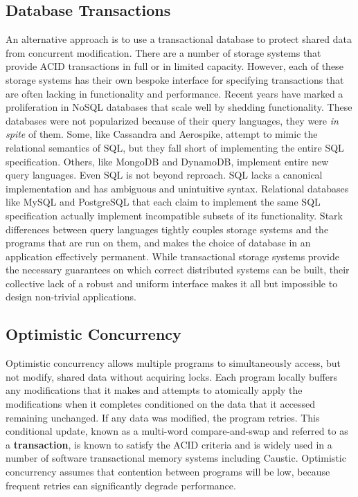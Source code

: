 \documentclass[../main.tex]{subfiles}
\begin{document}
  \subsection{Database Transactions}
  An alternative approach is to use a transactional database to protect shared data from concurrent
  modification. There are a number of storage systems that provide ACID transactions in full or in
  limited capacity. However, each of these storage systems has their own bespoke interface for
  specifying transactions that are often lacking in functionality and performance. Recent years have
  marked a proliferation in NoSQL databases that scale well by shedding functionality. These
  databases were not popularized because of their query languages, they were \emph{in spite} of
  them. Some, like Cassandra and Aerospike, attempt to mimic the relational semantics of SQL, but
  they fall short of implementing the entire SQL specification. Others, like MongoDB and DynamoDB,
  implement entire new query languages. Even SQL is not beyond reproach. SQL lacks a canonical
  implementation and has ambiguous and unintuitive syntax. \cite{sql} Relational databases like
  MySQL and PostgreSQL that each claim to implement the same SQL specification actually implement
  incompatible subsets of its functionality. Stark differences between query languages tightly
  couples storage systems and the programs that are run on them, and makes the choice of database
  in an application effectively permanent. While transactional storage systems provide the necessary
  guarantees on which correct distributed systems can be built, their collective lack of a robust
  and uniform interface makes it all but impossible to design non-trivial applications.

  \subsection{Optimistic Concurrency}
  Optimistic concurrency allows multiple programs to simultaneously access, but not modify, shared
  data without acquiring locks. Each program locally buffers any modifications that it makes and
  attempts to atomically apply the modifications when it completes conditioned on the data that it
  accessed remaining unchanged. If any data was modified, the program retries. This conditional
  update, known as a multi-word compare-and-swap and referred to as a \textbf{transaction}, is known
  to satisfy the ACID criteria and is widely used in a number of software transactional memory
  systems including Caustic. \cite{stm} Optimistic concurrency assumes that contention between
  programs will be low, because frequent retries can significantly degrade performance.
\end{document}
